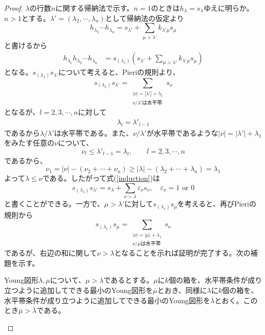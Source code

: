 \documentclass{ltjsreport}
\begin{document}
\begin{proof}
    $\lambda$の行数$n$に関する帰納法で示す。$n=1$のときは$h_\lambda=s_\lambda$ゆえに明らか。$n>1$とする。$\lambda'=(\lambda_2,\cdots,\lambda_n)$として帰納法の仮定より
    \[
    h_{\lambda_2}\cdots h_{\lambda_n}=s_{\lambda'}+\sum_{\mu>\lambda'}k_{\lambda'\mu}s_\mu    
    \]
    と書けるから
    \begin{align*}
        h_{\lambda_1}h_{\lambda_2}\cdots h_{\lambda_n}
        &=s_{(\lambda_1)}\left(s_{\lambda'}+\sum_{\mu>\lambda'}k_{\lambda'\mu}s_\mu \right)
    \end{align*}
    となる。$s_{(\lambda_1)}s_{\lambda'}$について考えると、Pieriの規則より、
    \begin{equation}\label{induction}
        s_{(\lambda_1)}s_{\lambda'}=\sum_{\substack{|\nu|=|\lambda'|+\lambda_1\\\nu/\lambda'\text{は水平帯}}}s_\nu 
    \end{equation}
    となるが、$l=2,3,\cdots,n$に対して
    \begin{align*}
        \lambda_l=\lambda'_{l-1}
    \end{align*}
    であるから$\lambda/\lambda'$は水平帯である。また、$\nu/\lambda'$が水平帯であるような$|\nu|=|\lambda'|+\lambda_1$をみたす任意の$\nu$について、
    \[
    \nu_l\leq\lambda'_{l-1}=\lambda_l,\qquad l=2,3,\cdots,n
    \]
    であるから、
    \[
    \nu_1=|\nu|-(\nu_2+\cdots+\nu_n)\geq |\lambda|-(\lambda_2+\cdots+\lambda_n)=\lambda_1    
    \]
    よって$\lambda\leq \nu$である。したがって式(\ref{induction})は
    \[
        s_{(\lambda_1)}s_{\lambda'}=s_{\lambda}+\sum_{\nu>\lambda}\varepsilon_{\nu}s_\nu,\quad \varepsilon_{\nu}=1\text{ or }0
    \]
    と書くことができる。一方で、$\mu>\lambda'$に対して$s_{(\lambda_1)}s_\mu$を考えると、再びPieriの規則から
    \begin{equation}\label{tmp}
    s_{(\lambda_1)}s_\mu=\sum_{\substack{|\nu|=|\mu|+\lambda_1 \\ \nu/\mu\text{は水平帯}}}s_\nu
    \end{equation}
    であるが、右辺の和に関して$\nu>\lambda$となることを示れば証明が完了する。次の補題を示す。
    \begin{lemm}
        Young図形$\lambda,\mu$について、$\mu>\lambda$であるとする。$\mu$に$k$個の箱を、水平帯条件が成り立つように追加してできる最小のYoung図形を$\overline{\mu}$とおき、同様に$\lambda$に$k$個の箱を、水平帯条件が成り立つように追加してできる最小のYoung図形を$\overline{\lambda}$とおく。このとき$\overline{\mu}>\overline{\lambda}$である。
    \end{lemm}


\end{proof}
\end{document}
